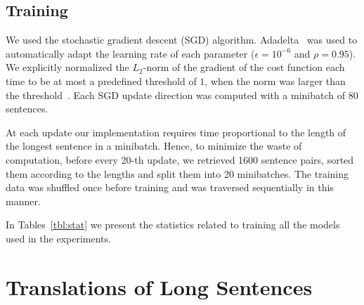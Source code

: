 \documentclass{article}
\begin{document}
\subsection{Training}

We used the stochastic gradient descent (SGD) algorithm.
Adadelta~\citep{Zeiler2012} was used to automatically adapt the learning rate of
each parameter ($\epsilon=10^{-6}$ and $\rho=0.95$). We explicitly normalized
the $L_2$-norm of the gradient of the cost function each time to be at most a
predefined threshold of $1$, when the norm was larger than the
threshold~\citep{Pascanu2013}.  Each SGD update direction was computed with a
minibatch of 80 sentences. 

At each update our implementation requires time proportional to the length of
the longest sentence in a minibatch. Hence, to minimize the waste of
computation, before every 20-th update, we retrieved 1600 sentence pairs, sorted them
according to the lengths and split them into 20 minibatches. The training data
was shuffled once before training and was traversed sequentially in this manner.

In Tables~\ref{tbl:stat} we present the statistics related to training all the
models used in the experiments.

\section{Translations of Long Sentences}
\label{sec:long_translation}
\end{document}
